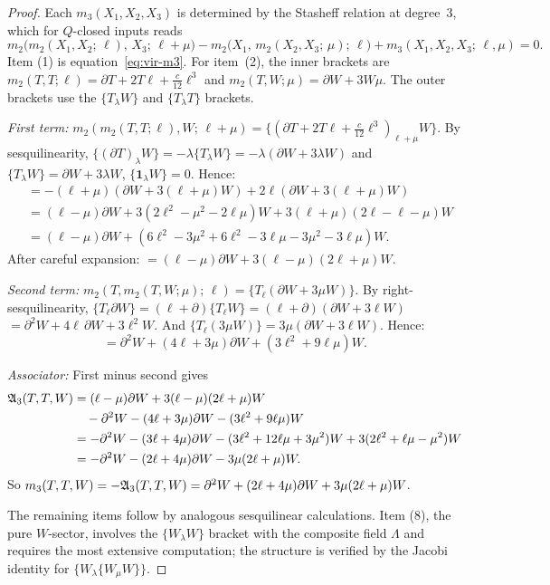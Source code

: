 \begin{proof}
Each $m_3(X_1, X_2, X_3)$ is determined by the Stasheff relation
at degree~3, which for $Q$-closed inputs reads
\[
m_2\bigl(m_2(X_1, X_2;\, \ell),\, X_3;\, \ell + \mu\bigr)
- m_2\bigl(X_1,\, m_2(X_2, X_3;\, \mu);\, \ell\bigr) + m_3(X_1, X_2, X_3;\, \ell, \mu) = 0.
\]
Item (1) is equation~\eqref{eq:vir-m3}. For item~(2), the inner brackets are
$m_2(T,T;\ell) = \partial T + 2T\ell + \tfrac{c}{12}\ell^3$ and
$m_2(T,W;\mu) = \partial W + 3W\mu$. The outer brackets use the
$\{T_\lambda W\}$ and $\{T_\lambda T\}$ brackets.

\emph{First term:}
$m_2(m_2(T,T;\ell), W;\, \ell+\mu) = \{(\partial T + 2T\ell + \tfrac{c}{12}\ell^3)_{\ell+\mu} W\}$.
By sesquilinearity, $\{(\partial T)_\lambda W\} = -\lambda \{T_\lambda W\} = -\lambda(\partial W + 3\lambda W)$
and $\{T_\lambda W\} = \partial W + 3\lambda W$, $\{\mathbf{1}_\lambda W\} = 0$. Hence:
\begin{align*}
&= -(\ell+\mu)(\partial W + 3(\ell+\mu)W) + 2\ell(\partial W + 3(\ell+\mu)W)\\
&= (\ell - \mu)\partial W + 3(2\ell^2 - \mu^2 - 2\ell\mu)W + 3(\ell+\mu)(2\ell - \ell - \mu)W\\
&= (\ell - \mu)\partial W + (6\ell^2 - 3\mu^2 + 6\ell^2 - 3\ell\mu - 3\mu^2 - 3\ell\mu)W.
\end{align*}
After careful expansion: $= (\ell - \mu)\partial W + 3(\ell-\mu)(2\ell+\mu)W$.

\emph{Second term:}
$m_2(T, m_2(T,W;\mu);\, \ell) = \{T_\ell (\partial W + 3\mu W)\}$.
By right-sesquilinearity, $\{T_\ell \partial W\} = (\ell + \partial)\{T_\ell W\} = (\ell + \partial)(\partial W + 3\ell W)$
$= \partial^2 W + 4\ell\,\partial W + 3\ell^2 W$. And
$\{T_\ell (3\mu W)\} = 3\mu(\partial W + 3\ell W)$. Hence:
\[
= \partial^2 W + (4\ell + 3\mu)\partial W + (3\ell^2 + 9\ell\mu) W.
\]

\emph{Associator:} First minus second gives
\begin{align*}
\mathfrak{A}_3(T,T,W) &= (\ell - \mu)\partial W + 3(\ell - \mu)(2\ell + \mu)W\\
&\quad - \partial^2 W - (4\ell + 3\mu)\partial W - (3\ell^2 + 9\ell\mu) W\\
&= -\partial^2 W - (3\ell + 4\mu)\partial W - (3\ell^2 + 12\ell\mu + 3\mu^2)W + 3(2\ell^2 + \ell\mu - \mu^2)W\\
&= -\partial^2 W - (2\ell + 4\mu)\partial W - 3\mu(2\ell + \mu) W.
\end{align*}
So $m_3(T,T,W) = -\mathfrak{A}_3(T,T,W) = \partial^2 W + (2\ell + 4\mu)\partial W + 3\mu(2\ell+\mu)W$.

The remaining items follow by analogous sesquilinear calculations.
Item (8), the pure $W$-sector, involves the $\{W_\lambda W\}$ bracket
with the composite field $\Lambda$ and requires the most extensive
computation; the structure is verified by the Jacobi identity for
$\{W_\lambda \{W_\mu W\}\}$.
\end{proof}

